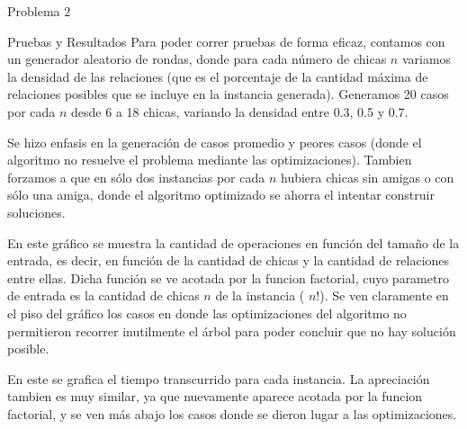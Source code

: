 \begin{section}{Problema 2}
\begin{subsection}{Pruebas y Resultados}
		Para poder correr pruebas de forma eficaz, contamos con un generador aleatorio de rondas, donde para cada número de chicas $n$ variamos la densidad de las relaciones (que es el porcentaje de la cantidad máxima de relaciones posibles que se incluye en la instancia generada). Generamos 20 casos por cada $n$ desde 6 a 18 chicas, variando la densidad entre 0.3, 0.5 y 0.7.

		 Se hizo enfasis en la generación de casos promedio y peores casos (donde el algoritmo no resuelve el problema mediante las optimizaciones). Tambien forzamos a que en sólo dos instancias por cada $n$ hubiera chicas sin amigas o con sólo una amiga, donde el algoritmo optimizado se ahorra el intentar construir soluciones.


		En este gráfico se muestra la cantidad de operaciones en función del tamaño de la entrada, es decir, en función de la cantidad de chicas y la cantidad de relaciones entre ellas. Dicha función se ve acotada por la funcion factorial, cuyo parametro de entrada es la cantidad de chicas $n$ de la instancia ( $n!$). Se ven claramente en el piso del gráfico los casos en donde las optimizaciones del algoritmo no permitieron recorrer inutilmente el árbol para poder concluir que no hay solución posible.

		En este se grafica el tiempo transcurrido para cada instancia. La apreciación tambien es muy similar, ya que nuevamente aparece acotada por la funcion factorial, y se ven más abajo los casos donde se dieron lugar a las optimizaciones.		

	\end{subsection}
\end{section}

